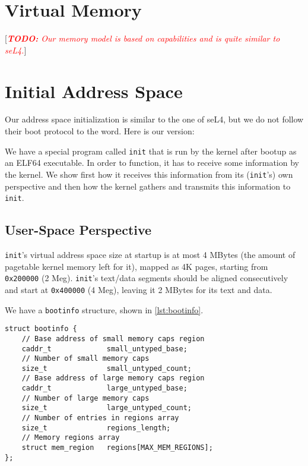 \documentclass{scrreprt}
\newcommand{\note}[1]{ [\textcolor{red}{\emph{#1}}]}
\newcommand{\todo}[1]{\note{\textbf{TODO:} #1}}
\begin{document}
  \section{Virtual Memory}

  \todo{Our memory model is based on capabilities and is quite similar to seL4.}

  \section{Initial Address Space}

  Our address space initialization is similar to the one of seL4, but
  we do not follow their boot protocol to the word. Here is our
  version:

  We have a special program called \lstinline+init+ that is run by the kernel
  after bootup as an ELF64 executable. In order to function, it has to
  receive some information by the kernel. We show first how it
  receives this information from its (\lstinline+init+'s) own perspective and
  then how the kernel gathers and transmits this information to
  \lstinline+init+.

  \subsection{User-Space Perspective}

  \lstinline+init+'s virtual address space size at startup is at most 4 MBytes
  (the amount of pagetable kernel memory left for it), mapped as 4K
  pages, starting from \lstinline+0x200000+ (2 Meg). \lstinline+init+'s text/data segments
  should be aligned consecutively and start at \lstinline+0x400000+ (4 Meg),
  leaving it 2 MBytes for its text and data.

  We have a \lstinline+bootinfo+ structure, shown in \autoref{lst:bootinfo}.

\begin{lstlisting}[float,caption={\lstinline+bootinfo+ structure},
  label=lst:bootinfo]
struct bootinfo {
    // Base address of small memory caps region
    caddr_t             small_untyped_base;
    // Number of small memory caps
    size_t              small_untyped_count;
    // Base address of large memory caps region
    caddr_t             large_untyped_base;
    // Number of large memory caps
    size_t              large_untyped_count;
    // Number of entries in regions array
    size_t              regions_length;
    // Memory regions array
    struct mem_region   regions[MAX_MEM_REGIONS];
};
\end{lstlisting}
\end{document}

